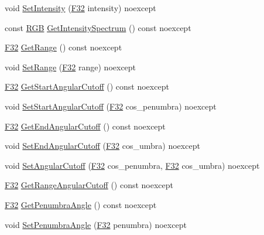 \begin{DoxyCompactItemize}
void \hyperlink{classmage_1_1_spot_light_a947290df545ea2a8ef2b486898b92bd3}{Set\+Intensity} (\hyperlink{namespacemage_aa97e833b45f06d60a0a9c4fc22ae02c0}{F32} intensity) noexcept
\item 
const \hyperlink{structmage_1_1_r_g_b}{R\+GB} \hyperlink{classmage_1_1_spot_light_ad05d3abab9285f8c25ac42ee446d6e05}{Get\+Intensity\+Spectrum} () const noexcept
\item 
\hyperlink{namespacemage_aa97e833b45f06d60a0a9c4fc22ae02c0}{F32} \hyperlink{classmage_1_1_spot_light_a19baba95ca8c5f5f6147ab0a03e6b64a}{Get\+Range} () const noexcept
\item 
void \hyperlink{classmage_1_1_spot_light_a96f8d35fe374f9d06c49d68a3ac1f213}{Set\+Range} (\hyperlink{namespacemage_aa97e833b45f06d60a0a9c4fc22ae02c0}{F32} range) noexcept
\item 
\hyperlink{namespacemage_aa97e833b45f06d60a0a9c4fc22ae02c0}{F32} \hyperlink{classmage_1_1_spot_light_a649e84aaf1f98c605f14d9597241df72}{Get\+Start\+Angular\+Cutoff} () const noexcept
\item 
void \hyperlink{classmage_1_1_spot_light_afae0adbfe0da1a897696a90294c93aef}{Set\+Start\+Angular\+Cutoff} (\hyperlink{namespacemage_aa97e833b45f06d60a0a9c4fc22ae02c0}{F32} cos\+\_\+penumbra) noexcept
\item 
\hyperlink{namespacemage_aa97e833b45f06d60a0a9c4fc22ae02c0}{F32} \hyperlink{classmage_1_1_spot_light_ad9c4cabf950619605a8040e41b9acb5b}{Get\+End\+Angular\+Cutoff} () const noexcept
\item 
void \hyperlink{classmage_1_1_spot_light_a2c200dc6f60a0c9a072680a9c5ee12d5}{Set\+End\+Angular\+Cutoff} (\hyperlink{namespacemage_aa97e833b45f06d60a0a9c4fc22ae02c0}{F32} cos\+\_\+umbra) noexcept
\item 
void \hyperlink{classmage_1_1_spot_light_aff7fad222e3c8e41d6fbeeea7f3a0893}{Set\+Angular\+Cutoff} (\hyperlink{namespacemage_aa97e833b45f06d60a0a9c4fc22ae02c0}{F32} cos\+\_\+penumbra, \hyperlink{namespacemage_aa97e833b45f06d60a0a9c4fc22ae02c0}{F32} cos\+\_\+umbra) noexcept
\item 
\hyperlink{namespacemage_aa97e833b45f06d60a0a9c4fc22ae02c0}{F32} \hyperlink{classmage_1_1_spot_light_ada7b32eb18cc2bb6707a62c4ab72f4f2}{Get\+Range\+Angular\+Cutoff} () const noexcept
\item 
\hyperlink{namespacemage_aa97e833b45f06d60a0a9c4fc22ae02c0}{F32} \hyperlink{classmage_1_1_spot_light_a37d61501193f5ed4ecefe4015595ed89}{Get\+Penumbra\+Angle} () const noexcept
\item 
void \hyperlink{classmage_1_1_spot_light_a7de9894d815f8ac69cbfefc8656e8f8f}{Set\+Penumbra\+Angle} (\hyperlink{namespacemage_aa97e833b45f06d60a0a9c4fc22ae02c0}{F32} penumbra) noexcept

\end{DoxyCompactItemize}
